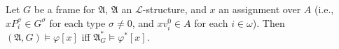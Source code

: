 Let $G$ be a frame for $\mathfrak{A}$, $\mathfrak{A}$ an $\mathcal{L}$-structure, and $x$ an assignment over $A$ (i.e., $xP_i^\sigma \in G^\sigma$ for each type $\sigma \neq 0$, and $xv_i^0 \in A$ for each $i \in \omega$). Then $(\mathfrak{A}, G) \models \varphi[x]$ iff $\mathfrak{A}_G^* \models \varphi^*[x]$.
